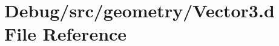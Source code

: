 \hypertarget{_vector3_8d}{}\section{Debug/src/geometry/\+Vector3.d File Reference}
\label{_vector3_8d}

